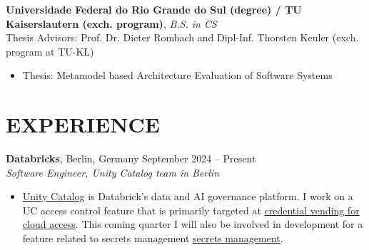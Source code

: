 \documentclass[centered,overlapped]{res}
\begin{document}
\begin{resume}
  \textbf{Universidade Federal do Rio Grande do Sul (degree) / TU Kaiserslautern (exch. program)}, {\sl B.S. in CS} \\ %
  Thesis Advisors: Prof. Dr. Dieter Rombach and Dipl-Inf. Thorsten Keuler (exch. program at TU-KL)
  \begin{itemize}  \itemsep -2pt
  \item Thesis: Metamodel based Architecture Evaluation of Software Systems
  \end{itemize}


%

\section{EXPERIENCE}

  \textbf{Databricks}, Berlin, Germany \hfill September 2024 -- Present \\
  {\sl Software Engineer, Unity Catalog team in Berlin}
  \begin{itemize}
  \item \href{https://www.databricks.com/product/unity-catalog}{Unity Catalog} is Databrick's data and AI governance platform. I work on a UC access control feature that is primarily targeted at \href{https://docs.databricks.com/en/connect/unity-catalog/cloud-services/service-credentials.html}{credential vending for cloud access}. This coming quarter I will also be involved in development for a feature related to secrets management \href{https://docs.databricks.com/en/security/secrets/index.html}{secrets management}.
  \end{itemize}


\end{resume}
\end{document}
